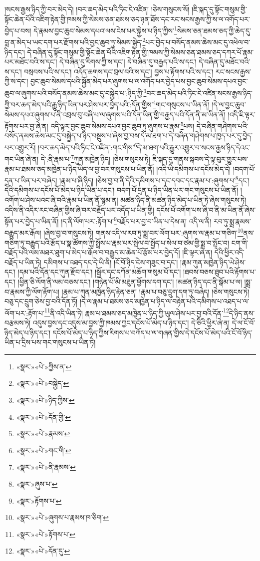 །སངས་རྒྱས་ཉིད་ཀྱི་བར་མེད་དེ། །བར་ཆད་མེད་པའི་ཏིང་ངེ་འཛིན། །ཅེས་གསུངས་སོ། །ཇི་སྐད་དུ་སྟོང་གསུམ་གྱི་སྟོང་ཆེན་པོའི་འཇིག་རྟེན་གྱི་ཁམས་ཀྱི་སེམས་ཅན་ཐམས་ཅད་ཉན་ཐོས་དང་རང་སངས་རྒྱས་ཀྱི་ས་ལ་འགོད་པར་བྱེད་པ་བས། དེ་རྣམས་བྱང་ཆུབ་སེམས་དཔའ་ལས་ངེས་པར་སྐྱེས་པ་ཉིད་ཀྱིས་\footnote{«སྣར་»«པེ་»ཀྱིས་ན་}སེམས་ཅན་ཐམས་ཅད་ཀྱི་ཆེད་དུ་བླ་ན་མེད་པ་ཡང་དག་པར་རྫོགས་པའི་བྱང་ཆུབ་ཏུ་སེམས་སྐྱེད་\footnote{«སྣར་»«པེ་»བསྐྱེད་}པར་བྱེད་པ་བསོད་ནམས་ཆེས་མང་དུ་འཕེལ་བ་ཉིད་དང་། དེ་བཞིན་དུ་སྟོང་གསུམ་གྱི་སྟོང་ཆེན་པོའི་འཇིག་རྟེན་གྱི་ཁམས་ཀྱི་སེམས་ཅན་ཐམས་ཅད་དཀར་པོ་རྣམ་པར་མཐོང་བའི་ས་དང་། དེ་བཞིན་དུ་རིགས་ཀྱི་ས་དང་། དེ་བཞིན་དུ་བརྒྱད་པའི་ས་དང་། དེ་བཞིན་དུ་མཐོང་བའི་ས་དང་། བསྲབས་པའི་ས་དང་། འདོད་ཆགས་དང་བྲལ་བའི་ས་དང་། བྱས་པ་རྟོགས་པའི་ས་དང་། རང་སངས་རྒྱས་ཀྱི་ས་དང་། བྱང་ཆུབ་སེམས་དཔའི་སྐྱོན་མེད་པར་ཞུགས་པ་ལ་འགོད་པར་བྱེད་པས་བྱང་ཆུབ་སེམས་དཔའ་བྱང་ཆུབ་ལ་ཞུགས་པའི་བསོད་ནམས་ཆེས་མང་དུ་བསྐྱེད་པ་:ཉིད་ཀྱི་\footnote{«སྣར་»«པེ་»ཉིད་ཀྱིས་}བར་ཆད་མེད་པའི་ཏིང་ངེ་འཛིན་སངས་རྒྱས་ཉིད་ཀྱི་བར་ཆད་མེད་པའི་རྒྱུ་ཉིད་ཡིན་པར་ཤེས་པར་བྱེད་པའི་:དོན་གྱིས་\footnote{«སྣར་»«པེ་»དོན་གྱི་}གང་གསུངས་པ་ཡིན་ནོ། །དེ་ལ་བྱང་ཆུབ་སེམས་དཔའ་ཞུགས་པ་ནི་འབྲས་བུ་བཞི་པ་ལ་ཞུགས་པའི་དོན་ཡིན་གྱི་བརྒྱད་པའི་དོན་ནི་མ་ཡིན་ནོ། །འདི་ཇི་ལྟར་རྟོགས་པར་བྱ་ཞེ་ན། འདི་ལྟར་བྱང་ཆུབ་སེམས་དཔའ་བྱང་ཆུབ་ཏུ་ཞུགས་པ་རྣམ་\footnote{«སྣར་»«པེ་»རྣམས་}པས། དེ་བཞིན་གཤེགས་པའི་བསོད་ནམས་ཆེས་མང་དུ་བསྐྱེད་པ་ཉིད་བསྡུས་པ་ཞེས་བྱ་བས་དེ་མ་ཐག་པ་དེ་བཞིན་གཤེགས་པ་ཁྱད་པར་དུ་བྱེད་པར་འགྱུར་རོ། །བར་ཆད་མེད་པའི་ཏིང་ངེ་འཛིན་:གང་གིས་\footnote{«སྣར་»«པེ་»གང་གི་}དེ་མ་ཐག་པའི་རྒྱུར་འགྱུར་བ་སངས་རྒྱས་ཉིད་དེའང་གང་ཡིན་ཞེ་ན། དེ་:ནི་རྣམ་པ་\footnote{«སྣར་»«པེ་»ནི་རྣམས་}ཀུན་མཁྱེན་ཉིད། །ཅེས་གསུངས་ཏེ། ཇི་སྐད་དུ་གནས་སྐབས་དེ་ལྟ་བུར་གྱུར་པས་རྣམ་པ་ཐམས་ཅད་མཁྱེན་པ་ཉིད་ཡིད་ལ་བྱ་བར་གསུངས་པ་ཡིན་ནོ། །འདི་ཡི་དམིགས་པ་དངོས་མེད་དེ། །བདག་པོ་དྲན་པ་ཡིན་པར་བཞེད། །རྣམ་པ་ཞི་ཉིད། །ཅེས་བྱ་བ་ནི་དེའི་དམིགས་པ་དང་དབང་དང་རྣམ་པ་:ཞུགས་པ་\footnote{«སྣར་»ཞུས་པ་}དང་། དེའི་དམིགས་པ་དངོས་པོ་མེད་པ་ཉིད་ཡིན་པ་དང་། བདག་པོ་དྲན་པ་ཉིད་ཡིན་པར་གང་གསུངས་པ་ཡིན་ནོ། །འགོག་པ་ཤེས་པའང་ཞི་བའི་རྣམ་པ་ཡིན་ནོ་སྙམ་ན། མཚན་ཉིད་ནི་མཚན་ཉིད་མེད་པ་ཡིན་ཏེ་ཞེས་གསུངས་ཏེ། འདིས་ནི་འདིར་རང་བཞིན་གྱིས་ཞི་བར་བརྗོད་པར་འདོད་པ་ཡིན་གྱི། དངོས་པོ་འགོག་པས་ཞི་བ་ནི་མ་ཡིན་ནོ་ཞེས་སྟོན་པར་བྱེད་པ་ཡིན་ནོ། །ད་ནི་ལོག་པར་:རྟོག་པ་\footnote{«སྣར་»རྟོགས་པ་}བརྗོད་པར་བྱ་བ་ཡིན་པ་དེས་ན། འདི་ལ་ནི། རབ་ཏུ་སྨྲ་རྣམས་བརྒྱུད་མར་རྒོལ། །ཞེས་བྱ་བ་གསུངས་ཏེ། གནས་འདི་ལ་རབ་ཏུ་སྨྲ་བར་ལོག་པར་:ཞུགས་ལ་རྣམ་པ་གཅིག་\footnote{«སྣར་»«པེ་»ཞུགས་པ་རྣམས་ཁ་ཅིག་}ནས་གཅིག་ཏུ་བརྒྱུད་པའི་རྩོད་པ་སྣ་ཚོགས་ཀྱི་སྤྲོས་པ་རྣམ་པར་སྤེལ་བ་སྤྱོད་པ་སེལ་བ་ཙམ་གྱི་སྨྲ་བ་སྤོང་བ། ངག་གི་བརྗོད་པའི་ལམ་མཐར་ཐུག་པ་མེད་པ་རྒོལ་བ་བརྒྱུད་མ་ཆེན་པོ་རྩོམ་པར་བྱེད་དོ། །ཇི་ལྟར་ཞེ་ན། དེའི་ཕྱིར་འདི་བརྗོད་པ་ཡིན་ཏེ། དམིགས་པ་འཐད་དང་དེ་ཡི་ནི། །ངོ་བོ་ཉིད་ངེས་གཟུང་བ་དང་། །རྣམ་ཀུན་མཁྱེན་ཉིད་ཡེ་ཤེས་དང་། །དམ་པའི་དོན་དང་ཀུན་རྫོབ་དང་། །སྦྱོར་དང་དཀོན་མཆོག་གསུམ་པོ་དང་། །ཐབས་བཅས་ཐུབ་པའི་རྟོགས་པ་དང་། །ཕྱིན་ཅི་ལོག་ནི་ལམ་བཅས་དང་། །གཉེན་པོ་མི་མཐུན་ཕྱོགས་དག་དང་། །མཚན་ཉིད་དང་ནི་སྒོམ་པ་ལ། །སྨྲ་བ་རྣམས་ཀྱི་ལོག་རྟོག་པ། །རྣམ་པ་ཀུན་མཁྱེན་ཉིད་རྟེན་ཅན། །རྣམ་པ་བཅུ་དྲུག་དག་ཏུ་བཞེད། །ཅེས་གསུངས་ཏེ། བཅུ་དང་དྲུག་ཅེས་བྱ་བའི་དོན་ཏོ། །དེ་ལ་རྣམ་པ་ཐམས་ཅད་མཁྱེན་པ་ཉིད་ལ་བརྟེན་པའི་དམིགས་པ་འཐད་པ་ལ་ལོག་པར་:རྟོག་པ་\footnote{«སྣར་»«པེ་»རྟོགས་པ་}ནི་འདི་ཡིན་ཏེ། རྣམ་པ་ཐམས་ཅད་མཁྱེན་པ་ཉིད་ཀྱི་ཡུལ་ཤེས་པར་བྱ་བའི་དོན་\footnote{«སྣར་»«པེ་»དོན་དུ་}དེ་ཉིད་ནས་བརྩམས་ཏེ། འདུས་བྱས་དང་འདུས་མ་བྱས་ཀྱི་ཁམས་ཀྱང་དངོས་པོ་མེད་པ་ཉིད་དང་། དེ་ཅིའི་ཕྱིར་ཞེ་ན། དེ་ལ་ངོ་བོ་ཉིད་མེད་པ་ཉིད་དང་། དངོས་པོ་མེད་པ་ཉིད་ཀྱིས་རིགས་པ་བཀོད་པ་ལ་གཞན་གྱིས་དེ་དངོས་པོ་མེད་པའི་ངོ་བོ་ཉིད་ཡིན་པ་དྲིས་པས་གང་གསུངས་པ་ཡིན་ཏེ། 